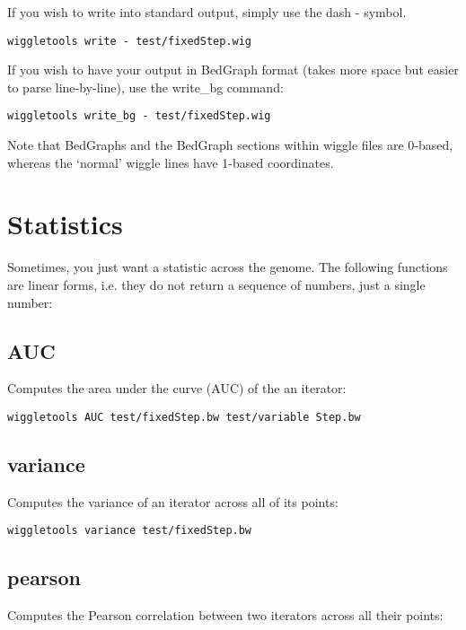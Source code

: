 \documentclass[12pt]{article}
\begin{document}
If you wish to write into standard output, simply use the dash - symbol.

\begin{verbatim}
wiggletools write - test/fixedStep.wig 
\end{verbatim}

If you wish to have your output in BedGraph format (takes more space but easier to parse line-by-line), use the write\_bg command:

\begin{verbatim}
wiggletools write_bg - test/fixedStep.wig 
\end{verbatim}

Note that BedGraphs and the BedGraph sections within wiggle files are 0-based, whereas the `normal' wiggle lines have 1-based coordinates.

\section{Statistics}

Sometimes, you just want a statistic across the genome. The following functions are linear forms, i.e. they do not return a sequence of numbers, just a single number:

\subsection{AUC}

Computes the area under the curve (AUC) of the an iterator:

\begin{verbatim}
wiggletools AUC test/fixedStep.bw test/variable Step.bw 
\end{verbatim}

\subsection{variance}

Computes the variance of an iterator across all of its points:

\begin{verbatim}
wiggletools variance test/fixedStep.bw 
\end{verbatim}

\subsection{pearson}

Computes the Pearson correlation between two iterators across all their points:
\end{document}
